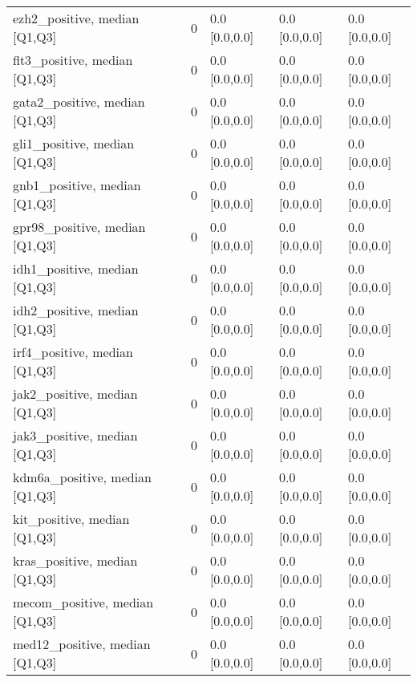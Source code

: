 \begin{tabular}{llllll}
ezh2\_positive, median [Q1,Q3] &     &                    0 &       0.0 [0.0,0.0] &       0.0 [0.0,0.0] &     0.0 [0.0,0.0] \\
flt3\_positive, median [Q1,Q3] &     &                    0 &       0.0 [0.0,0.0] &       0.0 [0.0,0.0] &     0.0 [0.0,0.0] \\
gata2\_positive, median [Q1,Q3] &     &                    0 &       0.0 [0.0,0.0] &       0.0 [0.0,0.0] &     0.0 [0.0,0.0] \\
gli1\_positive, median [Q1,Q3] &     &                    0 &       0.0 [0.0,0.0] &       0.0 [0.0,0.0] &     0.0 [0.0,0.0] \\
gnb1\_positive, median [Q1,Q3] &     &                    0 &       0.0 [0.0,0.0] &       0.0 [0.0,0.0] &     0.0 [0.0,0.0] \\
gpr98\_positive, median [Q1,Q3] &     &                    0 &       0.0 [0.0,0.0] &       0.0 [0.0,0.0] &     0.0 [0.0,0.0] \\
idh1\_positive, median [Q1,Q3] &     &                    0 &       0.0 [0.0,0.0] &       0.0 [0.0,0.0] &     0.0 [0.0,0.0] \\
idh2\_positive, median [Q1,Q3] &     &                    0 &       0.0 [0.0,0.0] &       0.0 [0.0,0.0] &     0.0 [0.0,0.0] \\
irf4\_positive, median [Q1,Q3] &     &                    0 &       0.0 [0.0,0.0] &       0.0 [0.0,0.0] &     0.0 [0.0,0.0] \\
jak2\_positive, median [Q1,Q3] &     &                    0 &       0.0 [0.0,0.0] &       0.0 [0.0,0.0] &     0.0 [0.0,0.0] \\
jak3\_positive, median [Q1,Q3] &     &                    0 &       0.0 [0.0,0.0] &       0.0 [0.0,0.0] &     0.0 [0.0,0.0] \\
kdm6a\_positive, median [Q1,Q3] &     &                    0 &       0.0 [0.0,0.0] &       0.0 [0.0,0.0] &     0.0 [0.0,0.0] \\
kit\_positive, median [Q1,Q3] &     &                    0 &       0.0 [0.0,0.0] &       0.0 [0.0,0.0] &     0.0 [0.0,0.0] \\
kras\_positive, median [Q1,Q3] &     &                    0 &       0.0 [0.0,0.0] &       0.0 [0.0,0.0] &     0.0 [0.0,0.0] \\
mecom\_positive, median [Q1,Q3] &     &                    0 &       0.0 [0.0,0.0] &       0.0 [0.0,0.0] &     0.0 [0.0,0.0] \\
med12\_positive, median [Q1,Q3] &     &                    0 &       0.0 [0.0,0.0] &       0.0 [0.0,0.0] &     0.0 [0.0,0.0] \\

\end{tabular}
